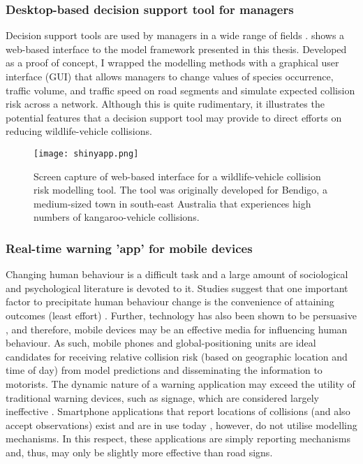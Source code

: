 \subsubsection{Desktop-based decision support tool for managers}

Decision support tools are used by managers in a wide range of fields \citep{shim02}.  shows a web-based interface to the model framework presented in this thesis. Developed as a proof of concept, I wrapped the modelling methods with a graphical user interface (GUI) that allows managers to change values of species occurrence, traffic volume, and traffic speed on road segments and simulate expected collision risk across a network. Although this is quite rudimentary, it illustrates the potential features that a decision support tool may provide to direct efforts on reducing wildlife-vehicle collisions.

\begin{figure*}[!t]
  \centering
  \texttt{[image: shinyapp.png]}
  \caption[Decision support tool for wildlife-vehicle collisions]{Screen capture of web-based interface for a wildlife-vehicle collision risk modelling tool. The tool was originally developed for Bendigo, a medium-sized town in south-east Australia that experiences high numbers of kangaroo-vehicle collisions.}
  \label{wvc_tool}
\end{figure*}

\subsubsection{Real-time warning 'app' for mobile devices}

Changing human behaviour is a difficult task and a large amount of sociological and psychological literature is devoted to it. Studies suggest that one important factor to precipitate human behaviour change is the convenience of attaining outcomes (least effort) \citep{zipf49}. Further, technology has also been shown to be persuasive \citep{fogg03,lath13}, and therefore, mobile devices may be an effective media for influencing human behaviour. As such, mobile phones and global-positioning units are ideal candidates for receiving relative collision risk (based on geographic location and time of day) from model predictions and disseminating the information to motorists. The dynamic nature of a warning application may exceed the utility of traditional warning devices, such as signage, which are considered largely ineffective \citep{bond13}.  Smartphone applications that report locations of collisions (and also accept observations) exist and are in use today \citep{aane09}, however, do not utilise modelling mechanisms. In this respect, these applications are simply reporting mechanisms and, thus, may only be slightly more effective than road signs.  

